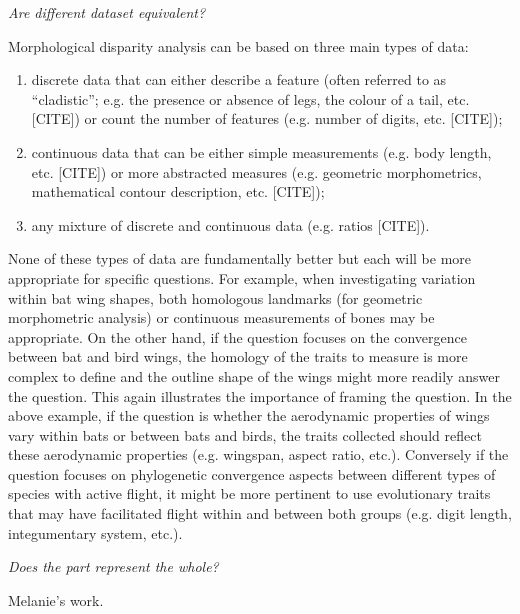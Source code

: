 \documentclass[12pt,letterpaper]{article}
\renewcommand{\subsection}[1]{%
\bigskip
\begin{center}
\begin{large}
\normalfont\itshape #1
\end{large}
\end{center}}
\begin{document}
\subsection{Are different dataset equivalent?}
Morphological disparity analysis can be based on three main types of data:
\begin{enumerate}
    \item discrete data that can either describe a feature (often referred to as ``cladistic''; e.g. the presence or absence of legs, the colour of a tail, etc. [CITE]) or count the number of features (e.g. number of digits, etc. [CITE]);
    \item continuous data that can be either simple measurements (e.g. body length, etc. [CITE]) or more abstracted measures (e.g. geometric morphometrics, mathematical contour description, etc. [CITE]);
    \item any mixture of discrete and continuous data (e.g. ratios [CITE]).
\end{enumerate}
None of these types of data are fundamentally better but each will be more appropriate for specific questions.
For example, when investigating variation within bat wing shapes, both homologous landmarks (for geometric morphometric analysis) or continuous measurements of bones may be appropriate.
On the other hand, if the question focuses on the convergence between bat and bird wings, the homology of the traits to measure is more complex to define and the outline shape of the wings might more readily answer the question.
This again illustrates the importance of framing the question.
In the above example, if the question is whether the aerodynamic properties of wings vary within bats or between bats and birds, the traits collected should reflect these aerodynamic properties (e.g. wingspan, aspect ratio, etc.).
Conversely if the question focuses on phylogenetic convergence aspects between different types of species with active flight, it might be more pertinent to use evolutionary traits that may have facilitated flight within and between both groups (e.g. digit length, integumentary system, etc.).


\subsection{Does the part represent the whole?}
Melanie's work.
\end{document}
